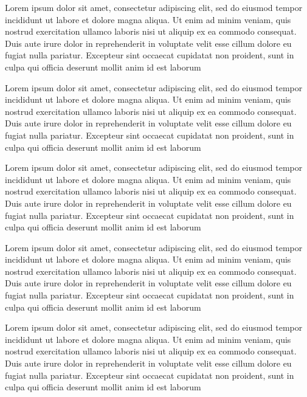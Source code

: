 Lorem ipsum dolor sit amet, consectetur adipiscing elit, sed do eiusmod tempor incididunt ut labore et dolore magna aliqua. Ut enim ad minim veniam, quis nostrud exercitation ullamco laboris nisi ut aliquip ex ea commodo consequat. Duis aute irure dolor in reprehenderit in voluptate velit esse cillum dolore eu fugiat nulla pariatur. Excepteur sint occaecat cupidatat non proident, sunt in culpa qui officia deserunt mollit anim id est laborum

Lorem ipsum dolor sit amet, consectetur adipiscing elit, sed do eiusmod tempor incididunt ut labore et dolore magna aliqua. Ut enim ad minim veniam, quis nostrud exercitation ullamco laboris nisi ut aliquip ex ea commodo consequat. Duis aute irure dolor in reprehenderit in voluptate velit esse cillum dolore eu fugiat nulla pariatur. Excepteur sint occaecat cupidatat non proident, sunt in culpa qui officia deserunt mollit anim id est laborum

Lorem ipsum dolor sit amet, consectetur adipiscing elit, sed do eiusmod tempor incididunt ut labore et dolore magna aliqua. Ut enim ad minim veniam, quis nostrud exercitation ullamco laboris nisi ut aliquip ex ea commodo consequat. Duis aute irure dolor in reprehenderit in voluptate velit esse cillum dolore eu fugiat nulla pariatur. Excepteur sint occaecat cupidatat non proident, sunt in culpa qui officia deserunt mollit anim id est laborum

Lorem ipsum dolor sit amet, consectetur adipiscing elit, sed do eiusmod tempor incididunt ut labore et dolore magna aliqua. Ut enim ad minim veniam, quis nostrud exercitation ullamco laboris nisi ut aliquip ex ea commodo consequat. Duis aute irure dolor in reprehenderit in voluptate velit esse cillum dolore eu fugiat nulla pariatur. Excepteur sint occaecat cupidatat non proident, sunt in culpa qui officia deserunt mollit anim id est laborum

Lorem ipsum dolor sit amet, consectetur adipiscing elit, sed do eiusmod tempor incididunt ut labore et dolore magna aliqua. Ut enim ad minim veniam, quis nostrud exercitation ullamco laboris nisi ut aliquip ex ea commodo consequat. Duis aute irure dolor in reprehenderit in voluptate velit esse cillum dolore eu fugiat nulla pariatur. Excepteur sint occaecat cupidatat non proident, sunt in culpa qui officia deserunt mollit anim id est laborum